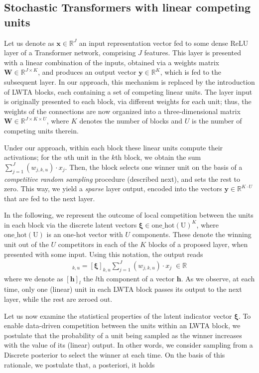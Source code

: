 \documentclass[10pt,twocolumn,letterpaper]{article}
\begin{document}
\subsection{Stochastic Transformers with linear competing units}

Let us denote as $\boldsymbol{x}\in\mathbb{R}^{J}$ an input representation vector fed to some dense ReLU layer of a Transformer network, comprising $J$ features. This layer is presented with a linear combination of the inputs, obtained via a weights matrix $\boldsymbol{W}\in\mathbb{R}^{J\times K}$, and produces an output vector $\boldsymbol{y}\in\mathbb{R}^{K}$, which is fed to the subsequent layer. In our approach, this mechanism is replaced by the introduction of LWTA blocks, each containing a set of competing linear units. The layer input is originally presented to each block, via different weights for each unit; thus, the weights of the connections are now organized into a three-dimensional matrix $\boldsymbol{W}\in \mathbb{R}^{J\times K \times U}$, where $K$ denotes the number of blocks and $U$ is the number of competing units therein.

Under our approach, within each block these linear units compute their activations; for the $u$th unit in the $k$th block, we obtain the sum
$\sum_{j=1}^J (w_{j,k,u} ) \cdot x_j$. Then, the block selects one winner unit on the basis of a \emph{competitive random sampling} procedure (described next), and sets the rest to zero. This way, we yield a \emph{sparse} layer output, encoded into the vectors $\boldsymbol{y}\in\mathbb{R}^{K \cdot U}$ that are fed to the next layer. 

In the following, we represent the outcome of local competition between the units in each block via the discrete latent vectors $\boldsymbol{\xi} \in \mathrm{one\_hot(U)}^K$, where $\mathrm{one\_hot(U)}$ is an one-hot vector with $U$ components. These denote the winning unit out of the $U$ competitors in each of the $K$ blocks of a proposed layer, when presented with some input. Using this notation, the output reads
\begin{align}
[\boldsymbol{y}]_{k,u} = [\boldsymbol{\xi}]_{k,u} \sum_{j=1}^J (w_{j,k,u} ) \cdot x_j \; \in \mathbb{R}
\end{align} where we denote as $[\boldsymbol{h}]_l$ the $l$th component of a vector $\boldsymbol{h}$. As we observe, at each time, only one (linear) unit in each LWTA block passes its output to the next layer, while the rest are zeroed out.

Let us now examine the statistical properties of the latent indicator vector $\boldsymbol{\xi}$. To enable data-driven competition between the units within an LWTA block, we postulate that the probability of a unit being sampled as the winner increases with the value of its (linear) output. In other words, we consider sampling from a Discrete posterior to select the winner at each time. On the basis of this rationale, we postulate that, a posteriori, it holds
\end{document}
